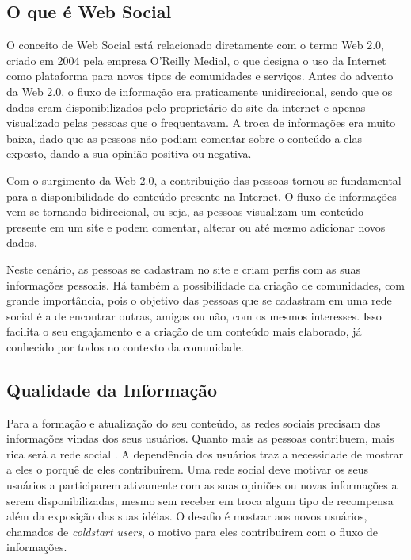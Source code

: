 \subsection{O que é Web Social}

O conceito de Web Social está relacionado diretamente com o termo Web 2.0, criado em 2004 pela empresa O'Reilly Medial, o que designa o uso da Internet como plataforma para novos tipos de comunidades e serviços. Antes do advento da Web 2.0, o fluxo de informação era praticamente unidirecional, sendo que os dados eram disponibilizados pelo proprietário do site da internet e apenas visualizado pelas pessoas que o frequentavam. A troca de informações era muito baixa, dado que as pessoas não podiam comentar sobre o conteúdo a elas exposto, dando a sua opinião positiva ou negativa.

Com o surgimento da Web 2.0, a contribuição das pessoas tornou-se fundamental para a disponibilidade do conteúdo presente na Internet. O fluxo de informações vem se tornando bidirecional, ou seja, as pessoas visualizam um conteúdo presente em um site e podem comentar, alterar ou até mesmo adicionar novos dados.

Neste cenário, as pessoas se cadastram no site e criam perfis com as suas informações pessoais. Há também a possibilidade da criação de comunidades, com grande importância, pois o objetivo das pessoas que se cadastram em uma rede social é a de encontrar outras, amigas ou não, com os mesmos interesses. Isso facilita o seu engajamento e a criação de um conteúdo mais elaborado, já conhecido por todos no contexto da comunidade.

\subsection{Qualidade da Informação}

Para a formação e atualização do seu conteúdo, as redes sociais precisam das informações vindas dos seus usuários. Quanto mais as pessoas contribuem, mais rica será a rede social \cite{burke2009fmm}. A dependência dos usuários traz a necessidade de mostrar a eles o porquê de eles contribuirem. Uma rede social deve motivar os seus usuários a participarem ativamente com as suas opiniões ou novas informações a serem disponibilizadas, mesmo sem receber em troca algum tipo de recompensa além da exposição das suas idéias. O desafio é mostrar aos novos usuários, chamados de \textit{coldstart users}, o motivo para eles contribuirem com o fluxo de informações.

